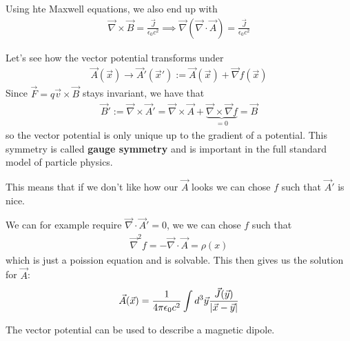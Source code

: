Using hte Maxwell equations, we also end up with
\begin{align*}
  \vec{\nabla} \times \vec{B} = \frac{\vec{J}}{\epsilon_0 c^{2}} \implies \vec{\nabla}(\vec{\nabla} \cdot \vec{A}) = \frac{\vec{J}}{\epsilon_0 c^{2}}
\end{align*}

Let's see how the vector potential transforms under
\begin{align*}
  \vec{A}(\vec{x}) \to \vec{A}'(\vec{x}') := \vec{A}(\vec{x}) + \vec{\nabla} f(\vec{x})
\end{align*}
Since $\vec{F} = q \vec{v} \times \vec{B}$ stays invariant, we have that
\begin{align*}
  \vec{B}' := \vec{\nabla} \times \vec{A}' = \vec{\nabla} \times \vec{A} + \underbrace{\vec{\nabla} \times \vec{\nabla}f}_{=0} = \vec{B}
\end{align*}
so the vector potential is only unique up to the gradient of a potential.
This symmetry is called \textbf{gauge symmetry} and is important in the full standard model of particle physics.

This means that if we don't like how our $\vec{A}$ looks we can chose $f$ such that $\vec{A}'$ is nice.

We can for example require $\vec{\nabla} \cdot \vec{A}' = 0$, we we can chose $f$ such that
\begin{align*}
  \vec{\nabla}^{2} f = - \vec{\nabla}\cdot \vec{A} = \rho(x) 
\end{align*}
which is just a poission equation and is solvable.
This then gives us the solution for $\vec{A}$:
\begin{align*}
  \vec{A}(\vec{x}) = \frac{1}{4 \pi \epsilon_0 c^{2}} \int d^{3}\vec{y} \frac{\vec{J}(\vec{y})}{\vert\vec{x} - \vec{y}\vert}
\end{align*}

The vector potential can be used to describe a magnetic dipole.

